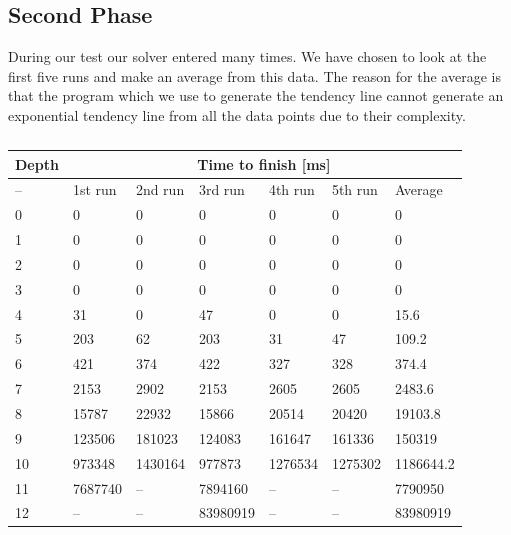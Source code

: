 \subsection{Second Phase}
During our test our solver entered  many times.
We have chosen to look at the first five runs and make an average from this data.
The reason for the average is that the program which we use to generate the tendency line cannot generate an exponential tendency line from all the data points due to their complexity.
\begin{table}[htb]
\centering
	\begin{tabular}{|l|l|l|l|l|l|l|}
	\hline
	Depth& \multicolumn{6}{|c|}{Time to finish [ms]}\\
	\hline
	--&1st run&2nd run&3rd run&4th run&5th run&Average\\
	\hline
	0&0&0&0&0&0&0\\
	\hline
	1&0&0&0&0&0&0\\
	\hline
	2&0&0&0&0&0&0\\
	\hline
	3&0&0&0&0&0&0\\
	\hline
	4&31&0&47&0&0&15.6\\
	\hline
	5&203&62&203&31&47&109.2\\
	\hline
	6&421&374&422&327&328&374.4\\
	\hline
	7&2153&2902&2153&2605&2605&2483.6\\
	\hline
	8&15787&22932&15866&20514&20420&19103.8\\
	\hline
	9&123506&181023&124083&161647&161336&150319\\
	\hline
	10&973348&1430164&977873&1276534&1275302&1186644.2\\
	\hline
	11&7687740&--&7894160&--&--&7790950\\
	\hline
	12&--&--&83980919&--&--&83980919\\
	\hline
	\end{tabular}
\caption{}
	\label{tab:timeData2}
\end{table}



